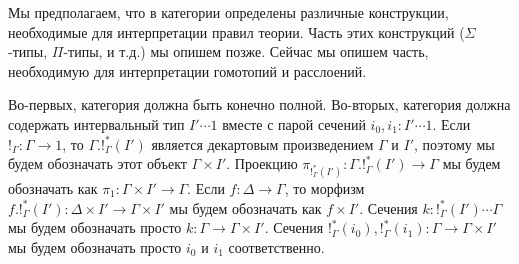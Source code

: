 \documentclass{amsart}
\makeatletter
\theoremstyle{definition}
\theoremstyle{remark}
\newcommand{\po}[1][dr]{\save*!/#1+1.2pc/#1:(1,-1)@^{|-}\restore}
\numberwithin{figure}{section}
\makeatother
\begin{document}
Мы предполагаем, что в категории определены различные конструкции, необходимые для интерпретации правил теории.
Часть этих конструкций ($\Sigma$-типы, $\Pi$-типы, и т.д.) мы опишем позже.
Сейчас мы опишем часть, необходимую для интерпретации гомотопий и расслоений.

Во-первых, категория должна быть конечно полной.
Во-вторых, категория должна содержать интервальный тип $I' \dotsb 1$ вместе с парой сечений $i_0, i_1 : I' \dotsb 1$.
Если $!_\Gamma : \Gamma \to 1$, то $\Gamma.!_\Gamma^*(I')$ является декартовым произведением $\Gamma$ и $I'$, поэтому мы будем обозначать этот объект $\Gamma \times I'$.
Проекцию $\pi_{!_\Gamma^*(I')} : \Gamma.!_\Gamma^*(I') \to \Gamma$ мы будем обозначать как $\pi_1 : \Gamma \times I' \to \Gamma$.
Если $f : \Delta \to \Gamma$, то морфизм $f.!_\Gamma^*(I') : \Delta \times I' \to \Gamma \times I'$ мы будем обозначать как $f \times I'$.
Сечения $k : !_\Gamma^*(I') \dotsb \Gamma$ мы будем обозначать просто $k : \Gamma \to \Gamma \times I'$.
Сечения $!_\Gamma^*(i_0), !_\Gamma^*(i_1) : \Gamma \to \Gamma \times I'$ мы будем обозначать просто $i_0$ и $i_1$ соответственно.

\begin{comment}
Также в категории должен быть выбран насыщенный класс морфизмов, которые мы называем \emph{тривиальными корасслоениями}.
Морфизмы, которые имеют правое свойство поднятия по отношению к тривиальным корасслоениям, мы называем \emph{расслоениями}.
Мы требуем, чтобы для любого $A \dotsb \Gamma$ морфизмы $\pi_A : \Gamma.A \to \Gamma$ являлись расслоениями.

Тривиальные корасслоения должны содержать морфизмы вида $i_0 : \Gamma \to \Gamma \times I'$ и
    $(\Gamma \times I' \amalg \Gamma \times I') \amalg_{\Gamma \amalg \Gamma} \Gamma \times I' \to \Gamma \times I' \times I'$, которые определяются как в следующей диаграмме:
\[ \xymatrix@-1pc{ \Gamma \amalg \Gamma \ar[rr]^{i_0 \amalg i_0} \ar[dd]_{[i_0, i_1]} & & \Gamma \times I' \amalg \Gamma \times I' \ar[dd] \ar[rddd]^{[i_0, i_1]} \\ \\
\Gamma \times I' \ar[rr] \ar[rrrd]_{i_0 \times id_{I'}} & & \po (\Gamma \times I' \amalg \Gamma \times I') \amalg_{\Gamma \amalg \Gamma} \Gamma \times I' \ar@{-->}[rd] \\
                                                                       & & & \Gamma \times I' \times I'
                 } \]
\end{comment}
\end{document}
